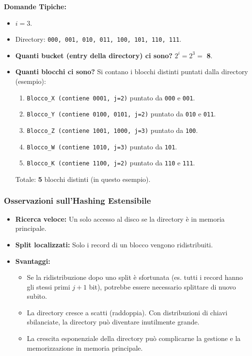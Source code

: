 \textbf{Domande Tipiche:}
\begin{itemize}
    \item $i = 3$.
    \item Directory: \texttt{000, 001, 010, 011, 100, 101, 110, 111}.
    \item \textbf{Quanti bucket (entry della directory) ci sono?} $2^i = 2^3 =$ \textbf{8}.
    \item \textbf{Quanti blocchi ci sono?} Si contano i blocchi distinti puntati dalla directory (esempio):
    \begin{enumerate}
        \item \texttt{Blocco\_X (contiene 0001, j=2)} puntato da \texttt{000} e \texttt{001}.
        \item \texttt{Blocco\_Y (contiene 0100, 0101, j=2)} puntato da \texttt{010} e \texttt{011}.
        \item \texttt{Blocco\_Z (contiene 1001, 1000, j=3)} puntato da \texttt{100}.
        \item \texttt{Blocco\_W (contiene 1010, j=3)} puntato da \texttt{101}.
        \item \texttt{Blocco\_K (contiene 1100, j=2)} puntato da \texttt{110} e \texttt{111}.
    \end{enumerate}
    Totale: \textbf{5} blocchi distinti (in questo esempio).
\end{itemize}

\subsubsection{Osservazioni sull'Hashing Estensibile}
\begin{itemize}
    \item \textbf{Ricerca veloce:} Un solo accesso al disco se la directory è in memoria principale.
    \item \textbf{Split localizzati:} Solo i record di un blocco vengono ridistribuiti.
    \item \textbf{Svantaggi:}
    \begin{itemize}
        \item Se la ridistribuzione dopo uno split è sfortunata (es. tutti i record hanno gli stessi primi $j+1$ bit), potrebbe essere necessario splittare di nuovo subito.
        \item La directory cresce a scatti (raddoppia). Con distribuzioni di chiavi sbilanciate, la directory può diventare inutilmente grande.
        \item La crescita esponenziale della directory può complicarne la gestione e la memorizzazione in memoria principale.
    \end{itemize}
\end{itemize}

